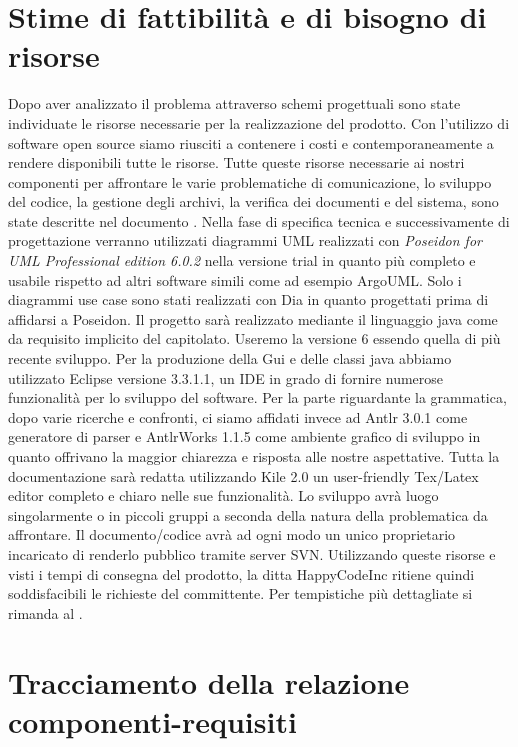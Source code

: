 \documentclass[11pt,titlepage,a4paper]{report}
\begin{document}
\chapter{Stime di fattibilit\`a e di bisogno di risorse}
Dopo aver analizzato il problema attraverso schemi progettuali sono state individuate le risorse necessarie per la realizzazione del prodotto. Con l'utilizzo di software open source siamo riusciti a contenere i costi e contemporaneamente a rendere disponibili tutte le risorse.
Tutte queste risorse necessarie ai nostri componenti per affrontare le varie problematiche di comunicazione, lo sviluppo del codice, la gestione degli archivi, la verifica dei documenti e del sistema, sono state descritte nel documento \PdQ.
Nella fase di specifica tecnica e successivamente di progettazione verranno utilizzati diagrammi UML realizzati con \textit{Poseidon for UML Professional edition 6.0.2} nella versione trial in quanto pi\`u completo e usabile rispetto ad altri software simili come ad esempio ArgoUML. Solo i diagrammi use case sono stati realizzati con Dia in quanto progettati prima di affidarsi a Poseidon.
Il progetto sar\`a realizzato mediante il linguaggio java come da requisito implicito del capitolato. Useremo la versione 6 essendo quella di pi\`u recente sviluppo.
Per la produzione della Gui e delle classi java abbiamo utilizzato Eclipse versione 3.3.1.1, un IDE in grado di fornire numerose funzionalit\`a per lo sviluppo del software.
Per la parte riguardante la grammatica, dopo varie ricerche e confronti, ci siamo affidati invece ad Antlr 3.0.1 come generatore di parser e AntlrWorks 1.1.5 come ambiente grafico di sviluppo in quanto offrivano la maggior chiarezza e risposta alle nostre aspettative.
Tutta la documentazione sar\`a redatta utilizzando Kile 2.0 un user-friendly Tex/Latex editor completo e chiaro nelle sue funzionalit\`a.
Lo sviluppo avr\`a luogo singolarmente o in piccoli gruppi a seconda della natura della problematica da affrontare.
Il documento/codice avr\`a ad ogni modo un unico proprietario incaricato di renderlo pubblico tramite server SVN.
Utilizzando queste risorse e visti i tempi di consegna del prodotto, la ditta HappyCodeInc ritiene quindi soddisfacibili le richieste del committente.
Per tempistiche pi\`u dettagliate si rimanda al \PdP.

\chapter{Tracciamento della relazione componenti-requisiti}
\end{document}
